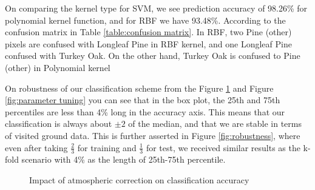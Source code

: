 \documentclass[remotesensing,article,accept,moreauthors,pdftex,12pt,a4paper]{mdpi}
\begin{document}
On comparing the kernel type for SVM, we see prediction accuracy of 98.26\% for polynomial kernel function, and for RBF we have 93.48\%. According to the confusion matrix in Table \ref{table:confusion matrix}. In RBF, two Pine (other) pixels are confused with Longleaf Pine in RBF kernel, and one Longleaf Pine confused with Turkey Oak. On the other hand, Turkey Oak is confused to Pine (other) in Polynomial kernel

On robustness of our classification scheme from the Figure \ref{fig:atmospheric correction} and Figure \ref{fig:parameter tuning} you can see that in the box plot, the 25th and 75th percentiles are less than 4\% long in the accuracy axis. This means that our classification is always about $\pm 2$ of the median, and that we are stable in terms of visited ground data. This is further asserted in Figure \ref{fig:robustness}, where even after taking $\frac{2}{3}$ for training and $\frac{1}{3}$ for test, we received similar results as the k-fold scenario with 4\% as the length of 25th-75th percentile. 






\begin{figure}[t]
  \centering
  \hspace{1em}%
   \caption{Impact of atmospheric correction on classification accuracy}
 \label{fig:atmospheric correction}
\end{figure}
\end{document}
